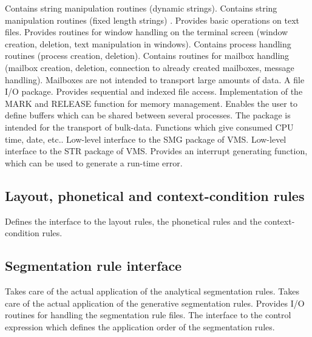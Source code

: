 \bsc
{} Contains string manipulation routines (dynamic strings).
 Contains string manipulation routines (fixed length strings)
.
 Provides basic operations on text files.
 Provides routines for window handling on the terminal
                       screen (window creation, deletion, text manipulation
                       in windows).
 Contains process handling routines (process creation,
                  deletion).
 Contains routines for mailbox handling (mailbox creation,
                  deletion, connection to already created mailboxes,
                  message handling). Mailboxes are not intended to
                  transport large amounts of data.
 A file I/O package. Provides sequential and indexed file
                  access.
 Implementation of the MARK and RELEASE function for
                      memory management.
 Enables the user to define buffers which can be shared
                   between several processes. The package is intended for the
                   transport of bulk-data.
 Functions which give consumed CPU time, date, etc..
\esc
\bsc
{} Low-level interface to the SMG package of VMS.
 Low-level interface to the STR package of VMS.
 Provides an interrupt generating function, which can be
                 used to generate a run-time error.
\esc

\subsection{Layout, phonetical and context-condition rules}

\bsc
{} Defines the interface to the layout rules, the phonetical
                   rules and the context-condition rules.
\esc

\subsection{Segmentation rule interface}

\bsc
{} Takes care of the actual application of the
                          analytical segmentation rules.
 Takes care of the actual application of the
                          generative segmentation rules.
   \bsc
    Provides I/O routines for handling the segmentation
                            rule files.
   \esc
{} The interface to the control expression which defines
                        the application order of the segmentation rules.
\esc


